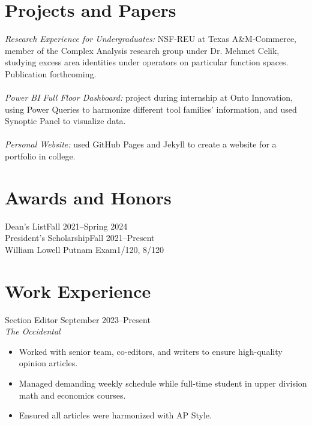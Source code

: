 \documentclass[margin, 12pt]{res} %
\begin{document}
\begin{resume}
\section{\sc Projects and Papers}
{\sl Research Experience for Undergraduates:} NSF-REU at Texas A\&M-Commerce, member of the Complex Analysis research group under Dr. Mehmet Celik, studying excess area identities under operators on particular function spaces. Publication forthcoming.\\
\vspace{4pt}\\
{\sl Power BI Full Floor Dashboard:} project during internship at Onto Innovation, using Power Queries to harmonize different tool families' information, and used Synoptic Panel to visualize data.\\
\vspace{4pt}\\
{\sl Personal Website:} used GitHub Pages and Jekyll to create a website for a portfolio in college.\\

\section{\sc Awards and Honors}
Dean's List\hfill Fall 2021--Spring 2024\\
President's Scholarship\hfill Fall 2021--Present\\
William Lowell Putnam Exam\hfill 1/120, 8/120

\section{\sc Work Experience}


Section Editor \hfill September 2023--Present \\
\textit{The Occidental}
\begin{itemize}\itemsep -2pt
  \item Worked with senior team, co-editors, and writers to ensure high-quality opinion articles.
  \item Managed demanding weekly schedule while full-time student in upper division math and economics courses.
  \item Ensured all articles were harmonized with AP Style.
\end{itemize}


\end{resume}
\end{document}
